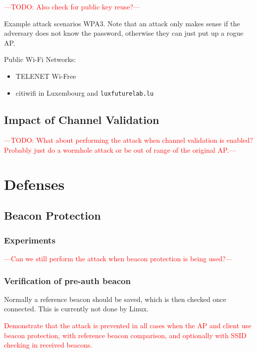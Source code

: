 \documentclass[sigconf,review]{acmart}
\newcommand{\wifi}{\mbox{Wi-Fi}}
\DeclareRobustCommand{\red}[1]{\textcolor{red}{#1}}
\begin{document}
\red{---TODO: Also check for public key reuse?---}

Example attack scenarios WPA3.
Note that an attack only makes sense if the adversary does not know the password, otherwise they can just put up a rogue AP.

Public \wifi{} Networks:

\begin{itemize}
	\item TELENET Wi-Free
	\item citiwifi in Luxembourg and \verb|luxfuturelab.lu|
\end{itemize}


\subsection{Impact of Channel Validation}

\red{---TODO: What about performing the attack when channel validation is enabled? Probably just do a wormhole attack or be out of range of the original AP.---}

\section{Defenses}
\label{sec:defenses}

\subsection{Beacon Protection}

\subsubsection{Experiments}

\red{---Can we still perform the attack when beacon protection is being used?---}

\subsubsection{Verification of pre-auth beacon}

Normally a reference beacon should be saved, which is then checked once connected.
This is currently not done by Linux.

\red{Demonstrate that the attack is prevented in all cases when the AP and client use beacon protection, with reference beacon comparison, and optionally with SSID checking in received beacons.}
\end{document}
